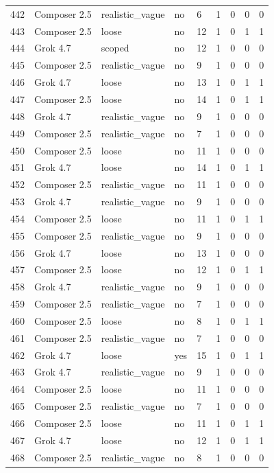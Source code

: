 \begin{tabular}{lllllllll}
442 & Composer 2.5 & realistic\_vague & no & 6 & 1 & 0 & 0 & 0 \\
443 & Composer 2.5 & loose & no & 12 & 1 & 0 & 1 & 1 \\
444 & Grok 4.7 & scoped & no & 12 & 1 & 0 & 0 & 0 \\
445 & Composer 2.5 & realistic\_vague & no & 9 & 1 & 0 & 0 & 0 \\
446 & Grok 4.7 & loose & no & 13 & 1 & 0 & 1 & 1 \\
447 & Composer 2.5 & loose & no & 14 & 1 & 0 & 1 & 1 \\
448 & Grok 4.7 & realistic\_vague & no & 9 & 1 & 0 & 0 & 0 \\
449 & Composer 2.5 & realistic\_vague & no & 7 & 1 & 0 & 0 & 0 \\
450 & Composer 2.5 & loose & no & 11 & 1 & 0 & 0 & 0 \\
451 & Grok 4.7 & loose & no & 14 & 1 & 0 & 1 & 1 \\
452 & Composer 2.5 & realistic\_vague & no & 11 & 1 & 0 & 0 & 0 \\
453 & Grok 4.7 & realistic\_vague & no & 9 & 1 & 0 & 0 & 0 \\
454 & Composer 2.5 & loose & no & 11 & 1 & 0 & 1 & 1 \\
455 & Composer 2.5 & realistic\_vague & no & 9 & 1 & 0 & 0 & 0 \\
456 & Grok 4.7 & loose & no & 13 & 1 & 0 & 0 & 0 \\
457 & Composer 2.5 & loose & no & 12 & 1 & 0 & 1 & 1 \\
458 & Grok 4.7 & realistic\_vague & no & 9 & 1 & 0 & 0 & 0 \\
459 & Composer 2.5 & realistic\_vague & no & 7 & 1 & 0 & 0 & 0 \\
460 & Composer 2.5 & loose & no & 8 & 1 & 0 & 1 & 1 \\
461 & Composer 2.5 & realistic\_vague & no & 7 & 1 & 0 & 0 & 0 \\
462 & Grok 4.7 & loose & yes & 15 & 1 & 0 & 1 & 1 \\
463 & Grok 4.7 & realistic\_vague & no & 9 & 1 & 0 & 0 & 0 \\
464 & Composer 2.5 & loose & no & 11 & 1 & 0 & 0 & 0 \\
465 & Composer 2.5 & realistic\_vague & no & 7 & 1 & 0 & 0 & 0 \\
466 & Composer 2.5 & loose & no & 11 & 1 & 0 & 1 & 1 \\
467 & Grok 4.7 & loose & no & 12 & 1 & 0 & 1 & 1 \\
468 & Composer 2.5 & realistic\_vague & no & 8 & 1 & 0 & 0 & 0 \\

\end{tabular}

